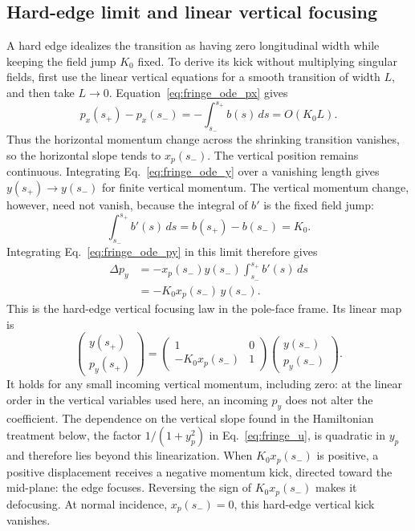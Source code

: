 \subsection{Hard-edge limit and linear vertical focusing}

A hard edge idealizes the transition as having zero longitudinal width
while keeping the field jump $K_0$ fixed. To derive its kick without
multiplying singular fields, first use the linear vertical equations for a
smooth transition of width $L$, and then take $L\to0$.
Equation~\eqref{eq:fringe_ode_px} gives
\begin{equation}
 p_x(s_+)-p_x(s_-)=-\int_{s_-}^{s_+}b(s)\,ds=O(K_0L).
\end{equation}
Thus the horizontal momentum change across the shrinking transition
vanishes, so the horizontal slope tends to $x_p(s_-)$.
The vertical position remains continuous. Integrating
Eq.~\eqref{eq:fringe_ode_y} over a vanishing length gives
$y(s_+)\to y(s_-)$ for finite vertical momentum.
The vertical momentum change, however, need not vanish, because the
integral of $b'$ is the fixed field jump:
\begin{equation}
 \int_{s_-}^{s_+}b'(s)\,ds=b(s_+)-b(s_-)=K_0.
\end{equation}
Integrating Eq.~\eqref{eq:fringe_ode_py} in this limit therefore gives
\begin{align}
 \Delta p_y
 &=-x_p(s_-)y(s_-)\int_{s_-}^{s_+}b'(s)\,ds\\
 &=-K_0x_p(s_-)\,y(s_-).
 \label{eq:fringe_hard_edge_kick}
\end{align}
This is the hard-edge vertical focusing law in the pole-face frame. Its
linear map is
\begin{equation}
 \begin{pmatrix}y(s_+)\\p_y(s_+)\end{pmatrix}
 =\begin{pmatrix}1&0\\-K_0x_p(s_-)&1\end{pmatrix}
  \begin{pmatrix}y(s_-)\\p_y(s_-)\end{pmatrix}.
\end{equation}
It holds for any small incoming vertical momentum, including zero: at the
linear order in the vertical variables used here, an incoming $p_y$ does not
alter the coefficient. The dependence on the vertical slope found in the
Hamiltonian treatment below, the factor $1/(1+y_p^2)$ in
Eq.~\eqref{eq:fringe_u}, is quadratic in $y_p$ and therefore lies beyond this
linearization.
When $K_0x_p(s_-)$ is positive, a positive displacement receives a negative momentum
kick, directed toward the mid-plane: the edge focuses. Reversing the sign
of $K_0x_p(s_-)$ makes it defocusing. At normal incidence, $x_p(s_-)=0$, this
hard-edge vertical kick vanishes.

